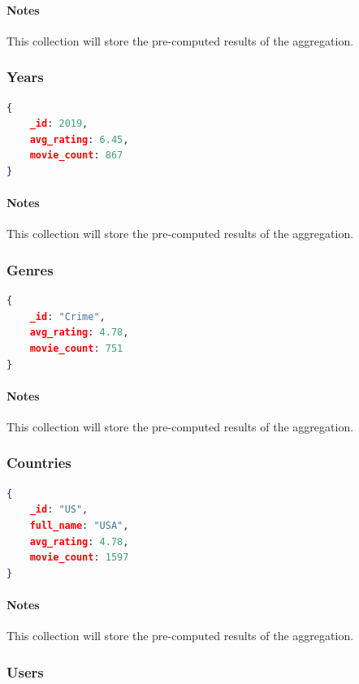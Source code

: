 \documentclass[11pt]{article}
\begin{document}
\paragraph{Notes}
This collection will store the pre-computed results of the aggregation.

\subsubsection{Years}
\label{sec:years}

\begin{lstlisting}[language=json]	
{
	_id: 2019,
	avg_rating: 6.45,
	movie_count: 867
}
\end{lstlisting}

\paragraph{Notes}
This collection will store the pre-computed results of the aggregation.

\subsubsection{Genres}
\label{sec:genres}

\begin{lstlisting}[language=json]	
{
	_id: "Crime",
	avg_rating: 4.78,
	movie_count: 751
}
\end{lstlisting}

\paragraph{Notes}
This collection will store the pre-computed results of the aggregation.

\subsubsection{Countries}
\label{sec:countries}

\begin{lstlisting}[language=json]	
{
	_id: "US",
	full_name: "USA",
	avg_rating: 4.78,
	movie_count: 1597
}
\end{lstlisting}

\paragraph{Notes}
This collection will store the pre-computed results of the aggregation.

\subsubsection{Users}
\label{sec:users}
\end{document}

